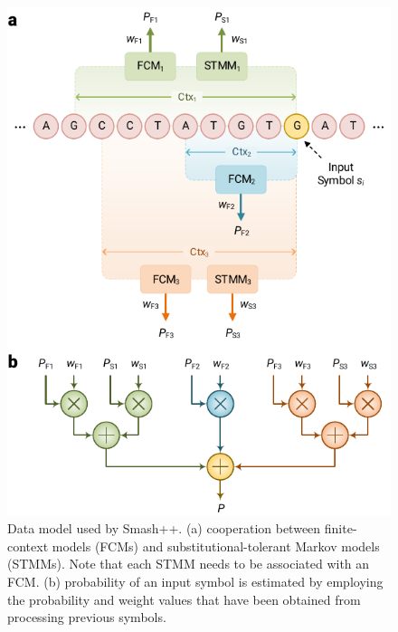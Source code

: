 \documentclass[a4paper,num-refs]{oup-contemporary}
\begin{document}
\begin{figure}[!t]
  \centering
  \includegraphics[width=\columnwidth]{fig/data_model.pdf}
  \caption{Data model used by Smash++. (a) cooperation between finite-context models (FCMs) and substitutional-tolerant Markov models (STMMs). Note that each STMM needs to be associated with an FCM. (b) probability of an input symbol is estimated by employing the probability and weight values that have been obtained from processing previous symbols.}
  \label{fig.model}
\end{figure}
\end{document}
